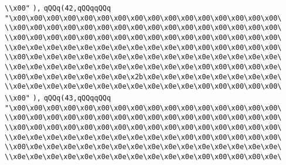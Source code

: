 \verb|\\x00"|\newline
\verb|),|\newline
\verb|qQQq(42,qQQqqQQq|\newline
\verb|"\x00\x00\x00\x00\x00\x00\x00\x00\x00\x00\x00\x00\x00\x00\x00\x00\|\newline
\verb|\\x00\x00\x00\x00\x00\x00\x00\x00\x00\x00\x00\x00\x00\x00\x00\x00\|\newline
\verb|\\x00\x00\x00\x00\x00\x00\x00\x00\x00\x00\x00\x00\x00\x00\x00\x00\|\newline
\verb|\\x0e\x0e\x0e\x0e\x0e\x0e\x0e\x0e\x0e\x0e\x00\x00\x00\x00\x00\x00\|\newline
\verb|\\x00\x0e\x0e\x0e\x0e\x0e\x0e\x0e\x0e\x0e\x0e\x0e\x0e\x0e\x0e\x0e\|\newline
\verb|\\x0e\x0e\x0e\x0e\x0e\x0e\x0e\x0e\x0e\x0e\x0e\x00\x00\x00\x00\x0e\|\newline
\verb|\\x00\x0e\x0e\x0e\x0e\x0e\x0e\x2b\x0e\x0e\x0e\x0e\x0e\x0e\x0e\x0e\|\newline
\verb|\\x0e\x0e\x0e\x0e\x0e\x0e\x0e\x0e\x0e\x0e\x0e\x00\x00\x00\x00\x00\|\newline
\verb|\\x00"|\newline
\verb|),|\newline
\verb|qQQq(43,qQQqqQQq|\newline
\verb|"\x00\x00\x00\x00\x00\x00\x00\x00\x00\x00\x00\x00\x00\x00\x00\x00\|\newline
\verb|\\x00\x00\x00\x00\x00\x00\x00\x00\x00\x00\x00\x00\x00\x00\x00\x00\|\newline
\verb|\\x00\x00\x00\x00\x00\x00\x00\x00\x00\x00\x00\x00\x00\x00\x00\x00\|\newline
\verb|\\x0e\x0e\x0e\x0e\x0e\x0e\x0e\x0e\x0e\x0e\x00\x00\x00\x00\x00\x00\|\newline
\verb|\\x00\x0e\x0e\x0e\x0e\x0e\x0e\x0e\x0e\x0e\x0e\x0e\x0e\x0e\x0e\x0e\|\newline
\verb|\\x0e\x0e\x0e\x0e\x0e\x0e\x0e\x0e\x0e\x0e\x0e\x00\x00\x00\x00\x0e\|\newline
